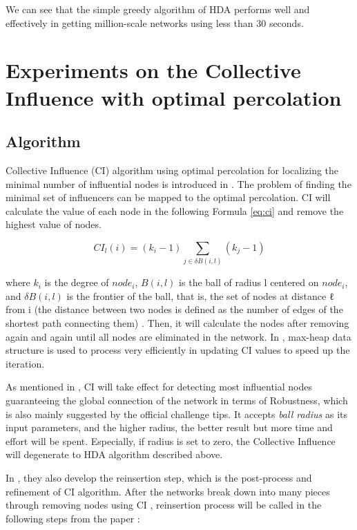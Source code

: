 \documentclass{article}
\begin{document}
	We can see that the simple greedy algorithm of HDA performs well and effectively in getting million-scale networks using less than 30 seconds. 


	\section{Experiments on the Collective Influence with optimal percolation}
	\subsection{Algorithm}		

	Collective Influence (CI) algorithm using optimal percolation for localizing the minimal number of influential nodes is introduced in \cite{morone2015influence} \cite{morone2016collective}. The problem of finding the minimal set of influencers can be mapped to the optimal percolation. CI will calculate the value of each node in the following Formula \ref{eq:ci}  and remove the highest value of nodes. 
	
	\begin{equation} \label{eq:ci}
		CI_l(i)=(k_i-1)\sum_{j\in\delta B(i,l)} (k_j-1)
	\end{equation}
	
	where $k_i$ is the degree of $node_i$, $B(i,l)$ is the ball of radius l centered on $node_i$, and $\delta B(i,l)$ is the frontier of the ball, that is, the set of nodes at distance ℓ from i (the distance between two nodes is defined as the number of edges of the shortest path connecting them) \cite{morone2016collective} . Then, it will calculate the nodes after removing again and again until all nodes are eliminated in the network. In \cite{morone2016collective},  max-heap data structure is used to process very efficiently in updating CI values to speed up the iteration. 
	
	As mentioned in \cite{lu2016vital}, CI will take effect for detecting most influential nodes guaranteeing the global connection of the network in terms of Robustness, which is also mainly suggested by the official challenge tips. It accepts \textit{ball radius} as its input parameters, and the higher radius, the better result but more time and effort will be spent. Especially, if radius is set to zero, the Collective Influence will degenerate to HDA algorithm described above.
	
	In \cite{morone2015influence} \cite{morone2016collective}, they also develop the reinsertion step, which is the post-process and  refinement of CI algorithm. After the networks break down into many pieces through removing nodes using CI , reinsertion process will be called in the following steps from the paper \cite{morone2016collective} : 
	
\end{document}
